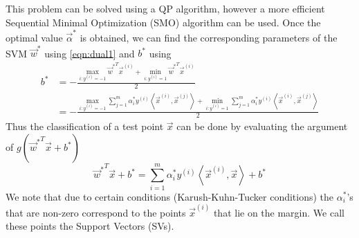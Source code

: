 This problem can be solved using a QP algorithm, however a more efficient Sequential Minimal Optimization (SMO) algorithm can be used. Once the optimal value  $\vec\alpha^\ast$ is obtained, we can find the corresponding parameters of the SVM $\vec w^\ast$ using \eqref{eqn:dual1} and $b^\ast$ using
	\begin{align}
		b^\ast 	& = - \frac{\max_{i: y^{(i)} = -1} {\vec w^*}^T \vec x ^{(i)} + \min_{i: y^{(i)} = 1} {\vec w^*}^T \vec x ^{(i)} }{2} \\
				& = - \frac{\max_{i: y^{(i)} = -1} \sum_{j = 1}^{m} \alpha^\ast_i y^{(i)} \left\langle \vec{x}^{(i)}, \vec{x}^{(j)} \right\rangle + \min_{i: y^{(i)} = 1} \sum_{j = 1}^{m} \alpha^\ast_i y^{(i)} \left\langle \vec{x}^{(i)}, \vec{x}^{(j)} \right\rangle }{2} \label{eqn:bStar}
	\end{align}
Thus the classification of a test point $\vec x$ can be done by evaluating the argument of $g({\vec w^\ast}^T \vec x + b^\ast)$
	\begin{equation}
		{\vec w^\ast}^T \vec x + b^\ast = \sum_{i = 1}^{m} \alpha_i^\ast y^{(i)} \left\langle \vec{x}^{(i)}, \vec{x} \right\rangle + b^\ast
		\label{eqn:svmClassifier}
	\end{equation}
We note that due to certain conditions (Karush-Kuhn-Tucker conditions) the $\alpha^\ast_i$'s that are non-zero correspond to the points $\vec x ^{(i)}$ that lie on the margin. We call these points the Support Vectors (SVs). 

